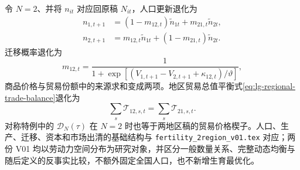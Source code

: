 \documentclass[UTF8,a4paper,zihao=-4,fontset=windows]{ctexart}
\numberwithin{equation}{section}
\begin{document}
令 $N=2$、并将 $n_{it}$ 对应回原稿 $N_{it}$，人口更新退化为
\begin{align}
 n_{1,t+1}&=(1-m_{12,t})\widetilde n_{1t}+m_{21,t}\widetilde n_{2t},\\
 n_{2,t+1}&=m_{12,t}\widetilde n_{1t}+(1-m_{21,t})\widetilde n_{2t}.
\end{align}
迁移概率退化为
\begin{equation}
 m_{12,t}=\frac{1}{1+\exp[(V_{1,t+1}-V_{2,t+1}+\kappa_{12,t})/\vartheta]},
\end{equation}
商品价格与贸易份额中的来源求和变成两项。地区贸易总值平衡式\eqref{eq:lg-regional-trade-balance}退化为
\begin{equation}
 \sum_s\mathcal T_{12,s,t}=\sum_s\mathcal T_{21,s,t}.
\end{equation}
对称特例中的 $\mathcal D_N(\tau)$ 在 $N=2$ 时也等于两地区稿的贸易价格楔子。人口、生产、迁移、资本和市场出清的基础结构与 \texttt{fertility\_2region\_v01.tex} 对应；两份 V01 均以劳动力空间分布为研究对象，并区分一般数量关系、完整动态均衡与随后定义的反事实比较，不额外固定全国人口，也不新增生育最优化。
\end{document}
